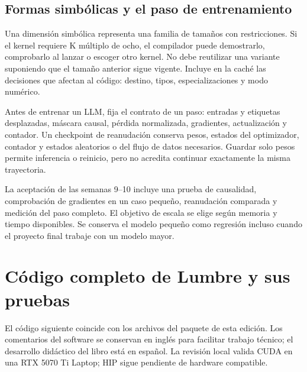 \documentclass[12pt,a4paper,oneside]{report}
\begin{document}
\section{Formas simbólicas y el paso de entrenamiento}
Una dimensión simbólica representa una familia de tamaños con restricciones. Si el kernel requiere K múltiplo de ocho, el compilador puede demostrarlo, comprobarlo al lanzar o escoger otro kernel. No debe reutilizar una variante suponiendo que el tamaño anterior sigue vigente. Incluye en la caché las decisiones que afectan al código: destino, tipos, especializaciones y modo numérico.

Antes de entrenar un LLM, fija el contrato de un paso: entradas y etiquetas desplazadas, máscara causal, pérdida normalizada, gradientes, actualización y contador. Un checkpoint de reanudación conserva pesos, estados del optimizador, contador y estados aleatorios o del flujo de datos necesarios. Guardar solo pesos permite inferencia o reinicio, pero no acredita continuar exactamente la misma trayectoria.

La aceptación de las semanas 9--10 incluye una prueba de causalidad, comprobación de gradientes en un caso pequeño, reanudación comparada y medición del paso completo. El objetivo de escala se elige según memoria y tiempo disponibles. Se conserva el modelo pequeño como regresión incluso cuando el proyecto final trabaje con un modelo mayor.


\appendix
\chapter{Código completo de Lumbre y sus pruebas}\label{app:codigo}
El código siguiente coincide con los archivos del paquete de esta edición. Los comentarios del software se conservan en inglés para facilitar trabajo técnico; el desarrollo didáctico del libro está en español. La revisión local valida CUDA en una RTX 5070 Ti Laptop; HIP sigue pendiente de hardware compatible.\par
\end{document}
